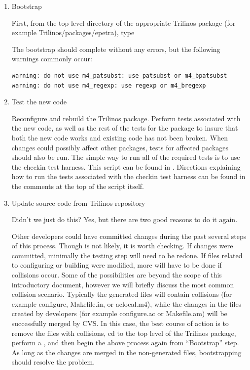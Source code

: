\documentclass[12pt,strict]{TrilinosDevGuide}
\begin{document}
\begin{enumerate}
\item Bootstrap

First, from the top-level directory of the appropriate Trilinos package (for 
example Trilinos/packages/epetra), type 


The bootstrap should complete without any errors, but the following warnings 
commonly occur:

\begin{verbatim}
warning: do not use m4_patsubst: use patsubst or m4_bpatsubst
warning: do not use m4_regexp: use regexp or m4_bregexp
\end{verbatim}

\item Test the new code

Reconfigure and rebuild the Trilinos package.  Perform tests associated with 
the new code, as well as the rest of the tests for the package to insure that 
both the new code works and existing code has not been broken.  When changes 
could possibly affect other packages, tests for affected packages should also 
be run.  The simple way to run all of the required tests is to use the 
checkin test harness.  This script can be found in \newline
{}.  Directions 
explaining how to run the tests associated with the checkin test harness can 
be found in the comments at the top of the script itself.

\item Update source code from Trilinos repository

Didn't we just do this?  Yes, but there are two good reasons to do it again.

Other developers could have committed changes during the past several 
steps of this process.  Though is not likely, it is worth checking.  If 
changes were committed, minimally the testing step will need to be redone.  
If files related to configuring or building were modified, more will have to 
be done if collisions occur.  Some of the possibilities are beyond the scope 
of this introductory document, however we will briefly discuss the most 
common collision scenario.  Typically the generated files will contain 
collisions (for example configure, Makefile.in, or aclocal.m4), while the 
changes in the files created by developers (for example configure.ac or 
Makefile.am) will be successfully merged by CVS.  In this case, the best 
course of action is to remove the files with collisions, cd to the top level 
of the Trilinos package, perform a , and then begin 
the above process again from ``Bootstrap'' step.  As long as the changes are 
merged in the non-generated files, bootstrapping should resolve the problem.


\end{enumerate}
\end{document}
